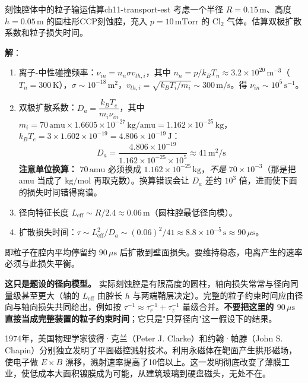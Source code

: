 \documentclass[12pt,a4paper,openany,oneside]{book}
\newcommand{\difficulty}[1]{\marginnote{\hfill\textcolor{coverMid!80}{\rule[-0.1em]{2pt}{0.9em}}\,\textcolor{coverMid}{\footnotesize\textbf{[#1]}}}}
\begin{document}
\begin{example}{刻蚀腔体中的粒子输运估算}{ch11-transport-est}
\label{ex:etcher-transport}
\difficulty{提高}
考虑一个半径 $R = 0.15\,\mathrm{m}$、高度 $h = 0.05\,\mathrm{m}$ 的圆柱形CCP刻蚀腔，充入 $p = 10\,\mathrm{mTorr}$ 的 $\mathrm{Cl}_2$ 气体。估算双极扩散系数和粒子损失时间。

\textbf{解}：
\begin{enumerate}
\item 离子-中性碰撞频率：$\nu_{in} = n_n \sigma v_{th,i}$，其中 $n_n = p/k_B T_n \approx 3.2\times 10^{20}\,\mathrm{m^{-3}}$（$T_n = 300\,\mathrm{K}$），$\sigma \sim 10^{-18}\,\mathrm{m^2}$，$v_{th,i} = \sqrt{k_B T_i/m_i} \sim 300\,\mathrm{m/s}$。得 $\nu_{in} \sim 10^5\,\mathrm{s^{-1}}$。
\item 双极扩散系数：$D_a = \dfrac{k_B T_e}{m_i \nu_{in}}$，其中 $m_i = 70\,\mathrm{amu}\times1.6605\times10^{-27}\,\mathrm{kg/amu}=1.162\times10^{-25}\,\mathrm{kg}$，$k_BT_e = 3\times1.602\times10^{-19}=4.806\times10^{-19}\,\mathrm{J}$：
\[
D_a = \frac{4.806\times10^{-19}}{1.162\times10^{-25}\times10^5} \approx 41\,\mathrm{m^2/s}
\]
\textbf{注意单位换算：} $70\,\mathrm{amu}$ 必须换成 $1.162\times10^{-25}\,\mathrm{kg}$，\emph{不是} $70\times10^{-3}$（那是把 amu 当成了 $\mathrm{kg/mol}$ 再取克数）。换算错误会让 $D_a$ 差约 $10^3$ 倍，进而使下面的损失时间错得离谱。
\item 径向特征长度 $L_{\text{eff}} \sim R/2.4 \approx 0.06\,\mathrm{m}$（圆柱腔最低径向模）。
\item 扩散损失时间：$\tau \sim L_{\text{eff}}^2/D_a \sim (0.06)^2/41 \approx 8.8\times10^{-5}\,\mathrm{s} \approx 90\,\mu\mathrm{s}$。
\end{enumerate}

即粒子在腔内平均停留约 $90\,\mu\mathrm{s}$ 后扩散到壁面损失。要维持稳态，电离产生的速率必须与此损失平衡。

\textbf{这只是题设的径向模型。} 实际刻蚀腔是有限高度的圆柱，轴向损失常常与径向同量级甚至更大（轴的 $L_{\text{eff}}$ 由腔长 $h$ 与两端鞘层决定）。完整的粒子约束时间应由径向与轴向损失共同给出，例如按 $\tau^{-1}\approx\tau_r^{-1}+\tau_z^{-1}$ 量级合并。\textbf{不要把这里的 $90\,\mu\mathrm{s}$ 直接当成完整装置的粒子约束时间}；它只是"只算径向"这一假设下的结果。
\end{example}

\begin{history}{}{}
1974年，美国物理学家彼得·克兰（Peter J. Clarke）和约翰·帕滕（John S. Chapin）分别独立发明了平面磁控溅射技术。利用永磁体在靶面产生拱形磁场，使电子做 $E\times B$ 漂移，溅射速率提高了10倍以上。这一发明彻底改变了薄膜工业，使低成本大面积镀膜成为可能，从建筑玻璃到硬盘磁头，无处不在。
\end{history}
\end{document}
